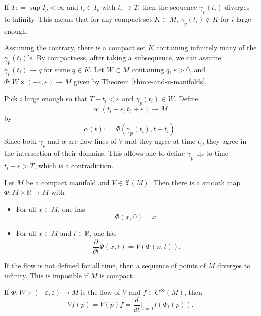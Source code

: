 \documentclass{ximera}
\begin{document}
    \begin{theorem}
        If $ T : = \sup I_p   < \infty $ and $t_i \in I_p$ with $t_i \to T$, then the sequence $\gamma _p (t_i) $ diverges to infinity. This means that for any compact set $K \subset M$, $\gamma _p (t_i )\notin K$ for $i$ large enough.  

    \begin{solution}
        Assuming the contrary, there is a compact set $K$ containing infinitely many of the $\gamma _p (t_i)$'s. By compactness, after taking a subsequence, we can assume $\gamma _p (t_i) \to q$ for some $q \in K$. Let $W \subset M$ containing $q$, $\varepsilon > 0 $, and $ \Phi : W \times (- \varepsilon , \varepsilon  ) \to M$  given by Theorem \ref{thm:e-and-u-manifolds}. 

        Pick $i$ large enough so that $ T - t_i < \varepsilon  $ and $\gamma _p (t_i) \in W$. Define 
        \[ \alpha : (t_i - \varepsilon , t_i + \varepsilon ) \to M \] 
        by
        \[        \alpha (t) : = \Phi (  \gamma_p (t_i) , t - t_i )  .     \]
        Since both $\gamma_p$ and $\alpha$ are flow lines of $V$ and they agree at time $t_i$, they agree in the intersection of their domains. This allows one to define $\gamma_p$ up  to time $t_i + \varepsilon > T $, which is a contradiction. 
    \end{solution}
    \end{theorem}

        
    \begin{corollary}
        Let $M$ be a compact manifold and $V \in \mathfrak{X}(M)$. Then there is a smooth map $\Phi : M \times \mathbb{R} \to M$ with 
        \begin{itemize}
        \item For all $x \in M$, one has 
        \[      \Phi (x,0) = x  .      \]
        \item For all $x \in M $ and $t \in \mathbb{R}$, one has 
        \[     \frac{\partial}{\partial t} \Phi (x,t) = V(\Phi (x,t)) .       \]
        \end{itemize}

    \begin{solution}
        If the flow is not defined for all time, then a sequence of points of $M$ diverges to infinity. This is imposible if $M$ is compact.
    \end{solution}
    \end{corollary}


    \begin{remark}
        If $\Phi : W \times (- \varepsilon , \varepsilon ) \to M$ is the flow of $V$ and $f \in C^{\infty}(M)$, then
        \[   Vf (p) =   V (p) f =  \frac{d}{dt} \Big \vert _{t = 0} f ( \Phi _t (p) ) .          \]
    \end{remark}
\end{document}
